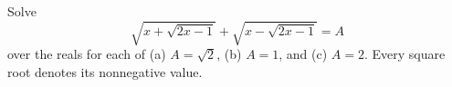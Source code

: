 Solve
\[
\sqrt{x+\sqrt{2x-1}}+\sqrt{x-\sqrt{2x-1}}=A
\]
over the reals for each of (a) $A=\sqrt2$, (b) $A=1$, and (c) $A=2$. Every square root denotes its nonnegative value.
